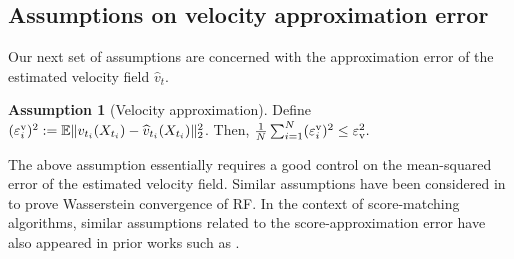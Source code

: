\documentclass{article}
\theoremstyle{plain}
\theoremstyle{definition}
\newtheorem{assumption}[theorem]{Assumption}
\theoremstyle{remark}
\newcommand{\red}[1]{{\color{red}#1}}
\def\bbE{\mathbb{E}}
\def\Norm#1{\Vert#1\Vert}
\def\evel{\varepsilon^{\rm v}}
\def\meanevel{\varepsilon_{\rm v}}
\begin{document}
\subsection{Assumptions on velocity approximation error}
Our next set of assumptions are concerned with the approximation error of the estimated velocity field $\hat v_{t}$. 
 
\begin{assumption}[Velocity approximation]
\label{assumption: velocity approximation}
    Define $(\evel_i)^2:= \bbE \Norm{v_{t_i}(X_{t_i}) - \widehat{v}_{t_i}(X_{t_i})}_2^2$. Then, 
    $\frac{1}{N} \sum_{i =1}^N (\evel_i)^2 \le \meanevel^2.$
\end{assumption}
The above assumption essentially requires a good control on the mean-squared error of the estimated velocity field. Similar assumptions have been considered in \citet{bansal2025wasserstein, guan2025mirror} to prove Wasserstein convergence of RF. In the context of score-matching algorithms, similar assumptions related to the score-approximation error have also appeared in prior works such as \citet{benton2023nearly, chen2022sampling, li2024sharp, liang2025low}. 

\end{document}
